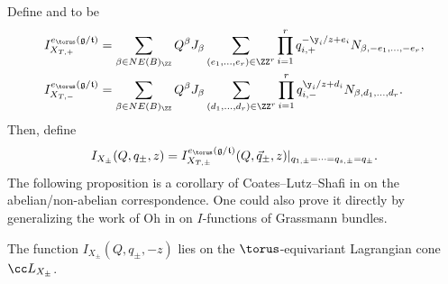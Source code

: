 Define  and  to be
\begin{align*}
&I_{X_{T, +}}^{e_\torus(\mathfrak g /\mathfrak t)}=
\sum_{\beta \in NE(B)_\ZZ} Q^\beta J_\beta \sum_{(e_1, \dots, e_r) \in \ZZ^r} \prod_{i=1}^r q_{i, +}^{-\y_i/z+e_i}N_{\beta, -e_1, \dots , -e_r}, \\
&I_{X_{T, -}}^{e_\torus(\mathfrak g /\mathfrak t)}=
\sum_{\beta \in NE(B)_\ZZ} Q^\beta J_\beta \sum_{(d_1, \dots, d_r) \in \ZZ^r} \prod_{i=1}^r q_{i, -}^{\y_i/z+d_i}N_{\beta, d_1, \dots , d_r}.
\end{align*}
Then, define
\[
I_{X_\pm}(Q, q_\pm, z) = I_{X_{T, \pm}}^{e_\torus(\mathfrak g /\mathfrak t)}(Q, \vec q_\pm, z)|_{q_{1, \pm} = \cdots = q_{s, \pm} = q_\pm}.
\]
The following proposition is a corollary of Coates--Lutz--Shafi in \cite{CLS} on the abelian/non-abelian correspondence. One could also prove it directly by generalizing the work of Oh in \cite{Oh1} on $I$-functions of Grassmann bundles.
\begin{Proposition}
The function $I_{X_\pm}(Q, q_\pm, -z)$ lies on the $\torus$-equivariant Lagrangian cone $\cc L_{X_\pm}$.
\end{Proposition}
